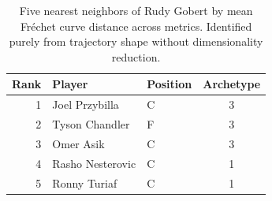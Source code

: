 \begin{table}[htbp]
  \centering\small
  \begin{tabular}{rllc}
    \toprule
    Rank & Player & Position & Archetype \\
    \midrule
    1 & Joel Przybilla & C & 3 \\
    2 & Tyson Chandler & F & 3 \\
    3 & Omer Asik & C & 3 \\
    4 & Rasho Nesterovic & C & 1 \\
    5 & Ronny Turiaf & C & 1 \\
    \bottomrule
  \end{tabular}
  \caption{Five nearest neighbors of Rudy Gobert by mean Fr\'{e}chet curve distance across metrics. Identified purely from trajectory shape without dimensionality reduction.}
  \label{tab:Rudy_Gobert_frechet_curve_neighbors}
\end{table}

